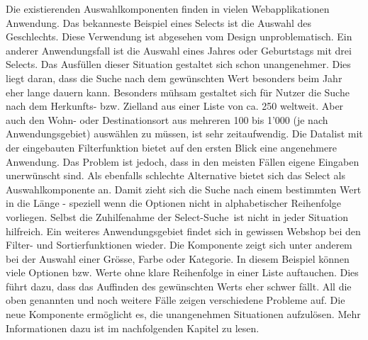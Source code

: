 Die existierenden Auswahlkomponenten finden in vielen Webapplikationen Anwendung.
Das bekanneste Beispiel eines Selects ist die Auswahl des Geschlechts.
Diese Verwendung ist abgesehen vom Design unproblematisch.
Ein anderer Anwendungsfall ist die Auswahl eines Jahres oder Geburtstags mit drei Selects.
Das Ausfüllen dieser Situation gestaltet sich schon unangenehmer.
Dies liegt daran, dass die Suche nach dem gewünschten Wert besonders beim Jahr eher lange dauern kann.
Besonders mühsam gestaltet sich für Nutzer die Suche nach dem Herkunfts- bzw. Zielland aus einer Liste von ca. 250 weltweit.
Aber auch den Wohn- oder Destinationsort aus mehreren 100 bis 1'000 (je nach Anwendungsgebiet) auswählen zu müssen, ist sehr zeitaufwendig.
Die Datalist mit der eingebauten Filterfunktion bietet auf den ersten Blick eine angenehmere Anwendung.
Das Problem ist jedoch, dass in den meisten Fällen eigene Eingaben unerwünscht sind.
Als ebenfalls schlechte Alternative bietet sich das Select als Auswahlkomponente an.
Damit zieht sich die Suche nach einem bestimmten Wert in die Länge - speziell wenn die Optionen nicht in alphabetischer Reihenfolge vorliegen.
Selbst die Zuhilfenahme der Select-Suche\footnotemark \ ist nicht in jeder Situation hilfreich. 
Ein weiteres Anwendungsgebiet findet sich in gewissen Webshop bei den Filter- und Sortierfunktionen wieder.
Die Komponente zeigt sich unter anderem bei der Auswahl einer Grösse, Farbe oder Kategorie.
In diesem Beispiel können viele Optionen bzw. Werte ohne klare Reihenfolge in einer Liste auftauchen.
Dies führt dazu, dass das Auffinden des gewünschten Werts eher schwer fällt.
All die oben genannten und noch weitere Fälle zeigen verschiedene Probleme auf.
Die neue Komponente ermöglicht es, die unangenehmen Situationen aufzulösen.
Mehr Informationen dazu ist im nachfolgenden Kapitel zu lesen.

